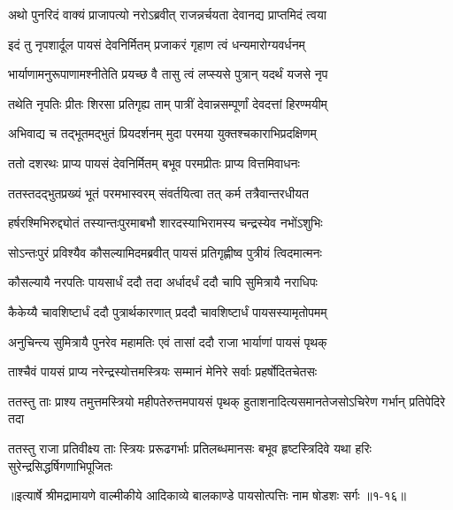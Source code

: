 \twolineshloka
{अथो पुनरिदं वाक्यं प्राजापत्यो नरोऽब्रवीत्}
{राजन्नर्चयता देवानद्य प्राप्तमिदं त्वया} %

\twolineshloka
{इदं तु नृपशार्दूल पायसं देवनिर्मितम्}
{प्रजाकरं गृहाण त्वं धन्यमारोग्यवर्धनम्} %

\twolineshloka
{भार्याणामनुरूपाणामश्नीतेति प्रयच्छ वै}
{तासु त्वं लप्स्यसे पुत्रान् यदर्थं यजसे नृप} %

\twolineshloka
{तथेति नृपतिः प्रीतः शिरसा प्रतिगृह्य ताम्}
{पात्रीं देवान्नसम्पूर्णां देवदत्तां हिरण्मयीम्} %

\twolineshloka
{अभिवाद्य च तद्भूतमद्भुतं प्रियदर्शनम्}
{मुदा परमया युक्तश्चकाराभिप्रदक्षिणम्} %

\twolineshloka
{ततो दशरथः प्राप्य पायसं देवनिर्मितम्}
{बभूव परमप्रीतः प्राप्य वित्तमिवाधनः} %

\twolineshloka
{ततस्तदद्भुतप्रख्यं भूतं परमभास्वरम्}
{संवर्तयित्वा तत् कर्म तत्रैवान्तरधीयत} %

\twolineshloka
{हर्षरश्मिभिरुद्द्योतं तस्यान्तःपुरमाबभौ}
{शारदस्याभिरामस्य चन्द्रस्येव नभोंऽशुभिः} %

\twolineshloka
{सोऽन्तःपुरं प्रविश्यैव कौसल्यामिदमब्रवीत्}
{पायसं प्रतिगृह्णीष्व पुत्रीयं त्विदमात्मनः} %

\twolineshloka
{कौसल्यायै नरपतिः पायसार्धं ददौ तदा}
{अर्धादर्धं ददौ चापि सुमित्रायै नराधिपः} %

\twolineshloka
{कैकेय्यै चावशिष्टार्धं ददौ पुत्रार्थकारणात्}
{प्रददौ चावशिष्टार्धं पायसस्यामृतोपमम्} %

\twolineshloka
{अनुचिन्त्य सुमित्रायै पुनरेव महामतिः}
{एवं तासां ददौ राजा भार्याणां पायसं पृथक्} %

\twolineshloka
{ताश्चैवं पायसं प्राप्य नरेन्द्रस्योत्तमस्त्रियः}
{सम्मानं मेनिरे सर्वाः प्रहर्षोदितचेतसः} %

\twolineshloka
{ततस्तु ताः प्राश्य तमुत्तमस्त्रियो महीपतेरुत्तमपायसं पृथक्}
{हुताशनादित्यसमानतेजसोऽचिरेण गर्भान् प्रतिपेदिरे तदा} %

\twolineshloka
{ततस्तु राजा प्रतिवीक्ष्य ताः स्त्रियः प्ररूढगर्भाः प्रतिलब्धमानसः}
{बभूव हृष्टस्त्रिदिवे यथा हरिः सुरेन्द्रसिद्धर्षिगणाभिपूजितः} %


॥इत्यार्षे श्रीमद्रामायणे वाल्मीकीये आदिकाव्ये बालकाण्डे पायसोत्पत्तिः नाम षोडशः सर्गः ॥१-१६॥
